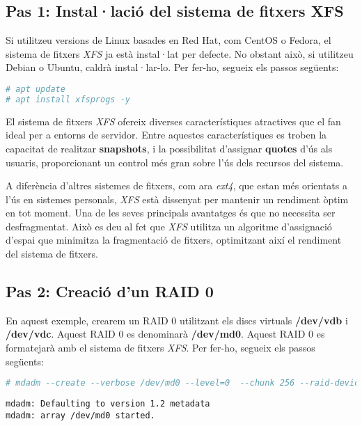 \subsection{Pas 1: Instal·lació del sistema de fitxers XFS}\label{pas-1-xfs}

Si utilitzeu versions de Linux basades en Red Hat, com CentOS o Fedora, el sistema de fitxers \emph{XFS} ja està instal·lat per defecte. No obstant això, si utilitzeu Debian o Ubuntu, caldrà instal·lar-lo. Per fer-ho, segueix els passos següents:

\begin{lstlisting}[language=bash, numbers=none, commentstyle=\color{black}]
# apt update
# apt install xfsprogs -y
\end{lstlisting}

El sistema de fitxers \emph{XFS} ofereix diverses característiques atractives que el fan ideal per a entorns de servidor. Entre aquestes característiques es troben la capacitat de realitzar \textbf{snapshots}, i la possibilitat d'assignar \textbf{quotes} d'ús als usuaris, proporcionant un control més gran sobre l'ús dels recursos del sistema.

A diferència d'altres sistemes de fitxers, com ara \emph{ext4}, que estan més orientats a l'ús en sistemes personals, \emph{XFS} està dissenyat per mantenir un rendiment òptim en tot moment. Una de les seves principals avantatges és que no necessita ser desfragmentat. Això es deu al fet que \emph{XFS} utilitza un algoritme d'assignació d'espai que minimitza la fragmentació de fitxers, optimitzant així el rendiment del sistema de fitxers.

\subsection{Pas 2: Creació d'un RAID 0}\label{pas-2-creació-dun-raid-0}

En aquest exemple, crearem un RAID 0 utilitzant els discs virtuals \textbf{/dev/vdb} i \textbf{/dev/vdc}. Aquest RAID 0 es denominarà \textbf{/dev/md0}. Aquest RAID 0 es formatejarà amb el sistema de fitxers \emph{XFS}. Per fer-ho, segueix els passos següents:

\begin{lstlisting}[language=bash, numbers=none, commentstyle=\color{black}]
# mdadm --create --verbose /dev/md0 --level=0  --chunk 256 --raid-devices=2 /dev/vdb /dev/vdc
\end{lstlisting}

\begin{terminaloutput}
\footnotesize\begin{verbatim}
mdadm: Defaulting to version 1.2 metadata
mdadm: array /dev/md0 started.
\end{verbatim}
\end{terminaloutput}

